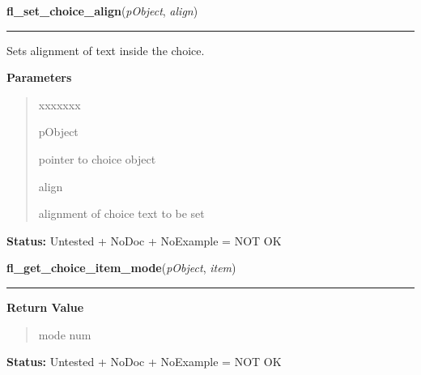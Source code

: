 \hspace{.8\funcindent}\begin{boxedminipage}{\funcwidth}

    \raggedright \textbf{fl\_set\_choice\_align}(\textit{pObject}, \textit{align})

    \vspace{-1.5ex}

    \rule{\textwidth}{0.5\fboxrule}
\setlength{\parskip}{2ex}
    Sets alignment of text inside the choice.

\setlength{\parskip}{1ex}
      \textbf{Parameters}
      \vspace{-1ex}

      \begin{quote}
        \begin{Ventry}{xxxxxxx}

          \item[pObject]

          pointer to choice object

          \item[align]

          alignment of choice text to be set

        \end{Ventry}

      \end{quote}

\textbf{Status:} Untested + NoDoc + NoExample = NOT OK



    \end{boxedminipage}

    \label{xformslib:library:fl_get_choice_item_mode}

    \vspace{0.5ex}

\hspace{.8\funcindent}\begin{boxedminipage}{\funcwidth}

    \raggedright \textbf{fl\_get\_choice\_item\_mode}(\textit{pObject}, \textit{item})

    \vspace{-1.5ex}

    \rule{\textwidth}{0.5\fboxrule}
\setlength{\parskip}{2ex}
\setlength{\parskip}{1ex}
      \textbf{Return Value}
    \vspace{-1ex}

      \begin{quote}
      mode num

      \end{quote}

\textbf{Status:} Untested + NoDoc + NoExample = NOT OK



    \end{boxedminipage}

